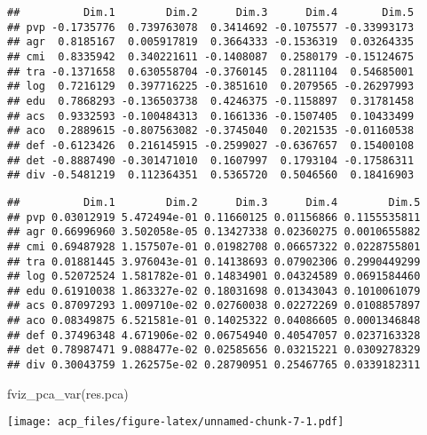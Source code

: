 \documentclass[
]{article}
\newenvironment{Shaded}{\begin{snugshade}}{\end{snugshade}}
\newcommand{\FunctionTok}[1]{\textcolor[rgb]{0.00,0.00,0.00}{#1}}
\newcommand{\NormalTok}[1]{#1}
\newcommand{\SpecialCharTok}[1]{\textcolor[rgb]{0.00,0.00,0.00}{#1}}
\begin{document}
\begin{verbatim}
##          Dim.1        Dim.2      Dim.3      Dim.4       Dim.5
## pvp -0.1735776  0.739763078  0.3414692 -0.1075577 -0.33993173
## agr  0.8185167  0.005917819  0.3664333 -0.1536319  0.03264335
## cmi  0.8335942  0.340221611 -0.1408087  0.2580179 -0.15124675
## tra -0.1371658  0.630558704 -0.3760145  0.2811104  0.54685001
## log  0.7216129  0.397716225 -0.3851610  0.2079565 -0.26297993
## edu  0.7868293 -0.136503738  0.4246375 -0.1158897  0.31781458
## acs  0.9332593 -0.100484313  0.1661336 -0.1507405  0.10433499
## aco  0.2889615 -0.807563082 -0.3745040  0.2021535 -0.01160538
## def -0.6123426  0.216145915 -0.2599027 -0.6367657  0.15400108
## det -0.8887490 -0.301471010  0.1607997  0.1793104 -0.17586311
## div -0.5481219  0.112364351  0.5365720  0.5046560  0.18416903
\end{verbatim}

\begin{Shaded}
\end{Shaded}

\begin{verbatim}
##          Dim.1        Dim.2      Dim.3      Dim.4        Dim.5
## pvp 0.03012919 5.472494e-01 0.11660125 0.01156866 0.1155535811
## agr 0.66996960 3.502058e-05 0.13427338 0.02360275 0.0010655882
## cmi 0.69487928 1.157507e-01 0.01982708 0.06657322 0.0228755801
## tra 0.01881445 3.976043e-01 0.14138693 0.07902306 0.2990449299
## log 0.52072524 1.581782e-01 0.14834901 0.04324589 0.0691584460
## edu 0.61910038 1.863327e-02 0.18031698 0.01343043 0.1010061079
## acs 0.87097293 1.009710e-02 0.02760038 0.02272269 0.0108857897
## aco 0.08349875 6.521581e-01 0.14025322 0.04086605 0.0001346848
## def 0.37496348 4.671906e-02 0.06754940 0.40547057 0.0237163328
## det 0.78987471 9.088477e-02 0.02585656 0.03215221 0.0309278329
## div 0.30043759 1.262575e-02 0.28790951 0.25467765 0.0339182311
\end{verbatim}

\begin{Shaded}
\begin{Highlighting}[]
\FunctionTok{fviz\_pca\_var}\NormalTok{(res.pca)}
\end{Highlighting}
\end{Shaded}

\texttt{[image: acp\_files/figure-latex/unnamed-chunk-7-1.pdf]}
\end{document}
